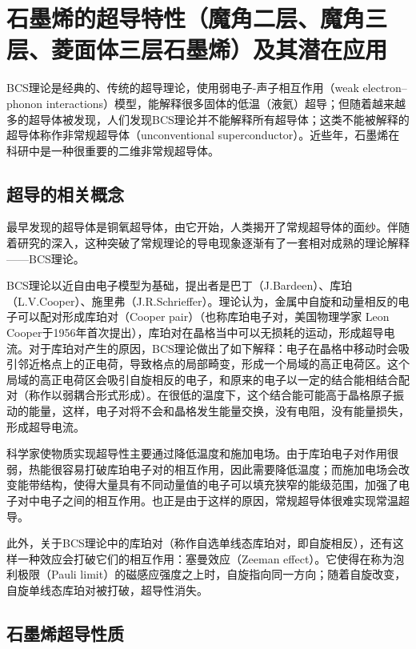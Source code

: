 
\chapter{石墨烯的超导特性（魔角二层、魔角三层、菱面体三层石墨烯）及其潜在应用}

BCS理论是经典的、传统的超导理论，使用弱电子-声子相互作用（weak electron–phonon interactions）模型，能解释很多固体的低温（液氦）超导；但随着越来越多的超导体被发现，人们发现BCS理论并不能解释所有超导体；这类不能被解释的超导体称作非常规超导体（unconventional superconductor）。近些年，石墨烯在科研中是一种很重要的二维非常规超导体。

\section{超导的相关概念}

最早发现的超导体是铜氧超导体，由它开始，人类揭开了常规超导体的面纱。伴随着研究的深入，这种突破了常规理论的导电现象逐渐有了一套相对成熟的理论解释——BCS理论。

BCS理论以近自由电子模型为基础，提出者是巴丁（J.Bardeen）、库珀（L.V.Cooper）、施里弗（J.R.Schrieffer）。理论认为，金属中自旋和动量相反的电子可以配对形成库珀对（Cooper pair）（也称库珀电子对，美国物理学家 Leon Cooper于1956年首次提出），库珀对在晶格当中可以无损耗的运动，形成超导电流。对于库珀对产生的原因，BCS理论做出了如下解释：电子在晶格中移动时会吸引邻近格点上的正电荷，导致格点的局部畸变，形成一个局域的高正电荷区。这个局域的高正电荷区会吸引自旋相反的电子，和原来的电子以一定的结合能相结合配对（称作以弱耦合形式形成）。在很低的温度下，这个结合能可能高于晶格原子振动的能量，这样，电子对将不会和晶格发生能量交换，没有电阻，没有能量损失，形成超导电流。

科学家使物质实现超导性主要通过降低温度和施加电场。由于库珀电子对作用很弱，热能很容易打破库珀电子对的相互作用，因此需要降低温度；而施加电场会改变能带结构，使得大量具有不同动量值的电子可以填充狭窄的能级范围，加强了电子对中电子之间的相互作用。也正是由于这样的原因，常规超导体很难实现常温超导。

此外，关于BCS理论中的库珀对（称作自选单线态库珀对，即自旋相反），还有这样一种效应会打破它们的相互作用：塞曼效应（Zeeman effect）。它使得在称为泡利极限（Pauli limit）的磁感应强度之上时，自旋指向同一方向；随着自旋改变，自旋单线态库珀对被打破，超导性消失。

\section{石墨烯超导性质}

